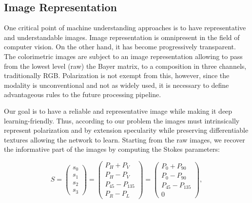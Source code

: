 \subsection{Image Representation}\label{rep_pol}

One critical point of machine understanding approaches is to have representative and understandable images. 
Image representation is omnipresent in the field of computer vision. On the other hand, it has become progressively transparent. The colorimetric images are subject to an image representation allowing to pass from the lowest level (raw) the Bayer matrix, to a composition in three channels, traditionally RGB.
Polarization is not exempt from this, however, since the modality is unconventional and not as widely used, it is necessary to define advantageous rules to the future processing pipeline.

Our goal is to have a reliable and representative image while making it deep learning-friendly. Thus, according to our problem the images must intrinsically represent polarization and by extension specularity while preserving differentiable textures allowing the network to learn. 
Starting from the raw images, we recover the informative part of the images by computing the Stokes parameters:

\begin{equation}
S = \begin{pmatrix}s_0\\s_1\\s_2\\s_3\end{pmatrix} = \begin{pmatrix}P_H + P_V\\ P_H - P_V\\ P_{45} - P_{135} \\ P_R - P_L\end{pmatrix} = \begin{pmatrix}P_0 + P_{90}\\ P_0 - P_{90}\\ P_{45} - P_{135} \\ 0\end{pmatrix},
\end{equation}

